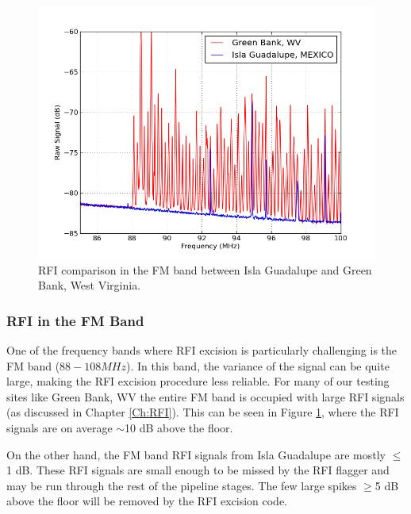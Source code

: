 \begin{figure}[htb]
\begin{center}
\includegraphics[width=0.9\linewidth]{Data_analysis/figures/FM_band_comp.png}
\caption{RFI comparison in the FM band between Isla Guadalupe and Green Bank, West Virginia. }
\label{Fig:FM_band}
\end{center}
\end{figure}

\subsubsection{RFI in the FM Band}

One of the frequency bands where RFI excision is particularly challenging is the FM band ($88-108 MHz$). In this band, the variance of the signal can be quite large, making the RFI excision procedure less reliable. For many of our testing sites like Green Bank, WV the entire FM band is occupied with large RFI signals (as discussed in Chapter \ref{Ch:RFI}). This can be seen in Figure \ref{Fig:FM_band}, where the RFI signals are on average $\sim$10 dB above the floor. 

On the other hand, the FM band RFI signals from Isla Guadalupe are mostly $\leq$1 dB. These RFI signals are small enough to be missed by the RFI flagger and may be run through the rest of the pipeline stages. The few large spikes $\geq$5 dB above the floor will be removed by the RFI excision code. 

